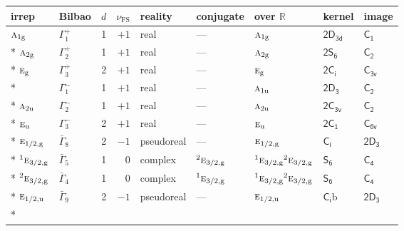 \documentclass[10pt,a4paper]{article}
\makeatletter
\def\grouprule#1#2{\noalign{\marks\LTgroupmarks{\the\belowrulesep}\nobreak\vskip#1%
  \vskip\aboverulesep}\multispan\LT@cols\unskip{\leaders\hrule\@height#2\hfill\kern\z@}\cr
  \noalign{\penalty\LTrulebreak\vskip\belowrulesep\global\@lastruleclass\z@}}
\numberwithin{equation}{section}
\newcommand{\grp}[1]{\mathsf{#1}}
\newcommand{\irr}[1]{\text{\normalfont\scshape #1}}
\newcommand{\conjpair}[1]{{}^{#1}}
\newcommand{\detbox}[1]{{\setlength{\fboxsep}{1pt}\fbox{#1}}}
\newcommand{\ptag}[1]{\mathrm{#1}}
\newcommand{\fsind}{\nu_{\mathrm{FS}}}
\newcommand{\secondclass}{\mathrm{b}}
\makeatother
\begin{document}
{\small\renewcommand{\arraystretch}{1.25}\setlength{\tabcolsep}{4pt}\begin{longtable}{@{}llrrlllll@{}}\toprule
irrep & Bilbao & $d$ & $\fsind$ & reality & conjugate & over $\mathbb{R}$ & kernel & image\\\midrule\endhead
\bottomrule\endfoot\endlastfoot
$\irr{a}_{1\ptag{g}}$ & $\Gamma_{1}^{+}$ & 1 & $+1$ & real & --- & $\irr{a}_{1\ptag{g}}$ & \href{2D3d.pdf}{$\grp{2D_{3d}}$} & \href{../../../rotation/data/pdf/C1.pdf}{$\grp{C_{1}}$}\\*
$\irr{a}_{2\ptag{g}}$ & $\Gamma_{2}^{+}$ & 1 & $+1$ & real & --- & $\irr{a}_{2\ptag{g}}$ & \href{2S6.pdf}{$\grp{2S_{6}}$} & \href{../../../rotation/data/pdf/C2.pdf}{$\grp{C_{2}}$}\\*
$\irr{e}_{\ptag{g}}$ & $\Gamma_{3}^{+}$ & 2 & $+1$ & real & --- & $\irr{e}_{\ptag{g}}$ & \href{2S2.pdf}{$\grp{2C_{i}}$} & \href{../../../rotation/data/pdf/C3v.pdf}{$\grp{C_{3v}}$}\\*
\detbox{$\irr{a}_{1\ptag{u}}$} & $\Gamma_{1}^{-}$ & 1 & $+1$ & real & --- & $\irr{a}_{1\ptag{u}}$ & \href{2D3.pdf}{$\grp{2D_{3}}$} & \href{../../../rotation/data/pdf/C2.pdf}{$\grp{C_{2}}$}\\*
$\irr{a}_{2\ptag{u}}$ & $\Gamma_{2}^{-}$ & 1 & $+1$ & real & --- & $\irr{a}_{2\ptag{u}}$ & \href{2C3v.pdf}{$\grp{2C_{3v}}$} & \href{../../../rotation/data/pdf/C2.pdf}{$\grp{C_{2}}$}\\*
$\irr{e}_{\ptag{u}}$ & $\Gamma_{3}^{-}$ & 2 & $+1$ & real & --- & $\irr{e}_{\ptag{u}}$ & \href{2C1.pdf}{$\grp{2C_{1}}$} & \href{../../../rotation/data/pdf/C6v.pdf}{$\grp{C_{6v}}$}\\*
\grouprule{0pt}{\lightrulewidth}
$\irr{e}_{1/2,\ptag{g}}$ & $\bar{\Gamma}_{8}$ & 2 & $-1$ & pseudoreal & --- & $\irr{e}_{1/2,\ptag{g}}$ & \href{S2.pdf}{$\grp{C_{i}}$} & \href{2D3.pdf}{$\grp{2D_{3}}$}\\*
$\conjpair{1}\irr{e}_{3/2,\ptag{g}}$ & $\bar{\Gamma}_{5}$ & 1 & $0$ & complex & $\conjpair{2}\irr{e}_{3/2,\ptag{g}}$ & $\conjpair{1}\irr{e}_{3/2,\ptag{g}}\conjpair{2}\irr{e}_{3/2,\ptag{g}}$ & \href{S6.pdf}{$\grp{S_{6}}$} & \href{../../../rotation/data/pdf/C4.pdf}{$\grp{C_{4}}$}\\*
$\conjpair{2}\irr{e}_{3/2,\ptag{g}}$ & $\bar{\Gamma}_{4}$ & 1 & $0$ & complex & $\conjpair{1}\irr{e}_{3/2,\ptag{g}}$ & $\conjpair{1}\irr{e}_{3/2,\ptag{g}}\conjpair{2}\irr{e}_{3/2,\ptag{g}}$ & \href{S6.pdf}{$\grp{S_{6}}$} & \href{../../../rotation/data/pdf/C4.pdf}{$\grp{C_{4}}$}\\*
$\irr{e}_{1/2,\ptag{u}}$ & $\bar{\Gamma}_{9}$ & 2 & $-1$ & pseudoreal & --- & $\irr{e}_{1/2,\ptag{u}}$ & \href{S2b.pdf}{$\grp{C_{i}}\secondclass$} & \href{2D3.pdf}{$\grp{2D_{3}}$}\\*

\end{longtable}}
\end{document}
